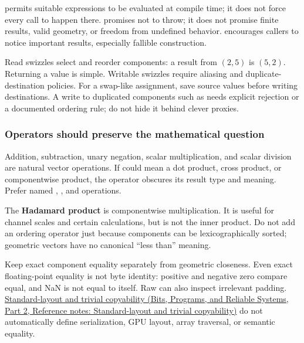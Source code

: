  permits suitable expressions to be evaluated at compile time; it does not force every call to happen there.  promises not to throw; it does not promise finite results, valid geometry, or freedom from undefined behavior. \BookInlineCode{{[}{[}nodiscard{]}{]}} encourages callers to notice important results, especially fallible construction.

Read swizzles select and reorder components: a  result from \((2,5)\) is \((5,2)\). Returning a value is simple. Writable swizzles require aliasing and duplicate-destination policies. For a swap-like assignment, save source values before writing destinations. A write to duplicated components such as  needs explicit rejection or a documented ordering rule; do not hide it behind clever proxies.

\subsubsection{Operators should preserve the mathematical question}\label{02-foundations-ii-ch037-operators-should-preserve-the-mathematical-question}

\hypertarget{02-foundations-ii-ch037-operators-should-preserve-the-mathematical-question}{}

Addition, subtraction, unary negation, scalar multiplication, and scalar division are natural vector operations. If  could mean a dot product, cross product, or componentwise product, the operator obscures its result type and meaning. Prefer named , , and  operations.

The \textbf{Hadamard product} is componentwise multiplication. It is useful for channel scales and certain calculations, but is not the inner product. Do not add an ordering operator just because components can be lexicographically sorted; geometric vectors have no canonical ``less than'' meaning.

Keep exact component equality separately from geometric closeness. Even exact floating-point equality is not byte identity: positive and negative zero compare equal, and NaN is not equal to itself. Raw  can also inspect irrelevant padding. \href{../01-Bits-Programs-and-Reliable-Systems-P02/main.pdf\#nameddest=appendix-958870a64c53}{Standard-layout and trivial copyability (Bits, Programs, and Reliable Systems, Part 2, Reference notes: Standard-layout and trivial copyability)} do not automatically define serialization, GPU layout, array traversal, or semantic equality.

